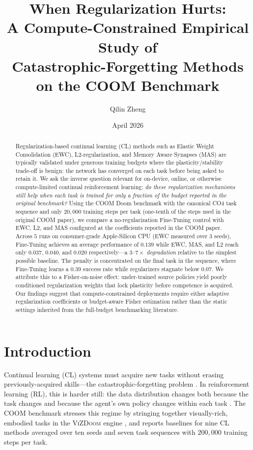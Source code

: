 \documentclass[11pt,a4paper]{article}
\title{When Regularization Hurts: \\[2pt]
  A Compute-Constrained Empirical Study of \\
  Catastrophic-Forgetting Methods on the COOM Benchmark}
\author{Qilin Zheng}
\affil{Final Year Project, Department of \emph{[your department]}}
\date{April 2026}
\begin{document}
\maketitle

\begin{abstract}
Regularization-based continual learning (CL) methods such as Elastic Weight
Consolidation (EWC), L2-regularization, and Memory Aware Synapses (MAS) are
typically validated under generous training budgets where the
plasticity/stability trade-off is benign: the network has converged on each
task before being asked to retain it. We ask the inverse question relevant for
on-device, online, or otherwise compute-limited continual reinforcement
learning: \emph{do these regularization mechanisms still help when each task
is trained for only a fraction of the budget reported in the original
benchmark?} Using the COOM Doom benchmark with the canonical CO4 task
sequence and only $20{,}000$ training steps per task (one-tenth of the steps
used in the original COOM paper), we compare a no-regularization Fine-Tuning
control with EWC, L2, and MAS configured at the coefficients reported in the
COOM paper. Across $5$ runs on consumer-grade Apple-Silicon CPU
(EWC measured over $3$ seeds), Fine-Tuning achieves an average performance
of $\mathbf{0.139}$ while EWC, MAS, and L2 reach only
$\mathbf{0.037}$, $\mathbf{0.040}$, and $\mathbf{0.020}$ respectively---a
$3$--$7\times$ \emph{degradation} relative to the simplest possible baseline.
The penalty is concentrated on the final task in the sequence, where
Fine-Tuning learns a $0.39$ success rate while regularizers stagnate below
$0.07$. We attribute this to a Fisher-on-noise effect: under-trained source
policies yield poorly conditioned regularization weights that lock plasticity
before competence is acquired. Our findings suggest that compute-constrained
deployments require either adaptive regularization coefficients or
budget-aware Fisher estimation rather than the static settings inherited
from the full-budget benchmarking literature.
\end{abstract}

\section{Introduction}
\label{sec:intro}

Continual learning (CL) systems must acquire new tasks without erasing
previously-acquired skills---the catastrophic-forgetting problem
\cite{parisi2019continual}. In reinforcement learning (RL), this is harder
still: the data distribution changes both because the task changes and
because the agent's own policy changes within each task
\cite{wolczyk2021cwsac}. The COOM benchmark \cite{tomilin2024coom} stresses
this regime by stringing together visually-rich, embodied tasks in the
\textsc{ViZDoom} engine \cite{kempka2016vizdoom}, and reports baselines for
nine CL methods averaged over ten seeds and seven task sequences with
$200{,}000$ training steps per task.
\end{document}
